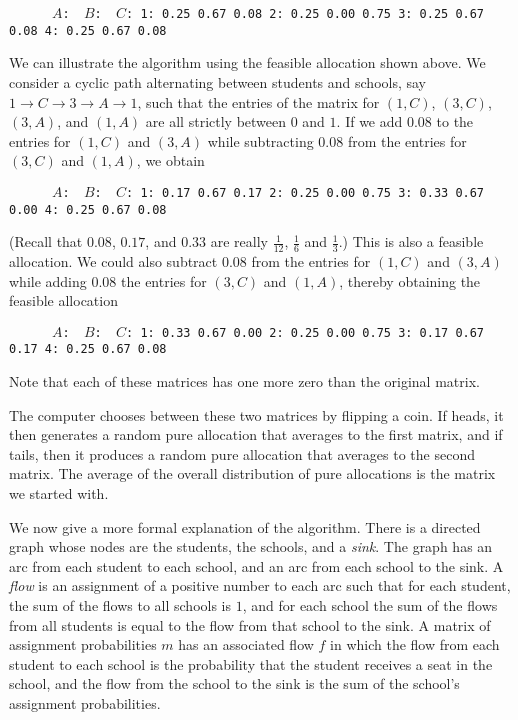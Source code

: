 \documentclass[12pt]{article}
\theoremstyle{definition}
\begin{document}
\begin{obeylines}\texttt{
\ \ \ \ \ $A$:    \     $B$:  \      $C$:
1:      0.25     0.67     0.08
2:      0.25     0.00     0.75
3:      0.25     0.67     0.08
4:      0.25     0.67     0.08
}
\end{obeylines} \noindent

\medskip
We can illustrate the algorithm using the feasible allocation shown
above.  We consider a cyclic path alternating between students and
schools, say $1 \to C \to 3 \to A \to 1$, such that the entries of the
matrix for $(1,C)$, $(3,C)$, $(3,A)$, and $(1,A)$ are all strictly
between $0$ and $1$.  If we add $0.08$ to the entries for $(1,C)$ and
$(3,A)$ while subtracting $0.08$ from the entries for $(3,C)$ and
$(1,A)$, we obtain
\begin{obeylines}\texttt{
\ \ \ \ \ $A$:    \     $B$:  \  $C$:
1:      0.17     0.67     0.17
2:      0.25     0.00     0.75
3:      0.33     0.67     0.00
4:      0.25     0.67     0.08
}
\end{obeylines} \noindent
(Recall that $0.08$, $0.17$, and $0.33$ are really $\tfrac{1}{12}$,
$\tfrac16$ and $\tfrac13$.)  This is also a feasible allocation.  We
could also subtract $0.08$ from the entries for $(1,C)$ and $(3,A)$
while adding $0.08$ the entries for $(3,C)$ and $(1,A)$, thereby
obtaining the feasible allocation
\begin{obeylines}\texttt{
\ \ \ \ \ $A$:    \     $B$:  \      $C$:
1:      0.33     0.67     0.00
2:      0.25     0.00     0.75
3:      0.17     0.67     0.17
4:      0.25     0.67     0.08
}
\end{obeylines} \noindent
Note that each of these matrices has one more zero than the original matrix.

The computer chooses between these two matrices by flipping a coin.
If heads, it then generates a random pure allocation that averages to
the first matrix, and if tails, then it produces a random pure
allocation that averages to the second matrix.  The average of the
overall distribution of pure allocations is the matrix we started
with.

We now give a more formal explanation of the algorithm.  There is a
directed graph whose nodes are the students, the schools, and a
\emph{sink}.  The graph has an arc from each student to each school,
and an arc from each school to the sink.  A \emph{flow} is an
assignment of a positive number to each arc such that for each
student, the sum of the flows to all schools is $1$, and for each
school the sum of the flows from all students is equal to the flow
from that school to the sink.  A matrix of assignment probabilities
$m$ has an associated flow $f$ in which the flow from each student to
each school is the probability that the student receives a seat in the
school, and the flow from the school to the sink is the sum of the
school's assignment probabilities.
\end{document}
